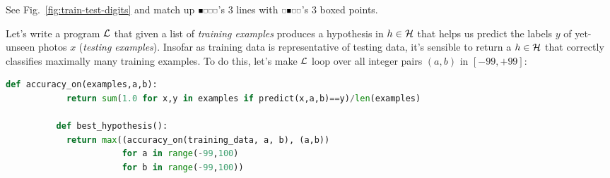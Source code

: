         \noindent
         {See Fig.\ \ref{fig:train-test-digits} and match up $\offourline{0}$'s $3$ lines with
        $\offourline{1}$'s $3$ boxed points.}


        Let's write a program $\mathcal{L}$ that given a list of \emph{training
        examples} produces a hypothesis in $h \in \mathcal{H}$ that helps us predict
        the labels $y$ of yet-unseen photos $x$ (\emph{testing examples}).
        Insofar as training data is representative of testing data, it's
        sensible to return a $h\in \mathcal{H}$ that correctly classifies maximally
        many training examples.
        To do this, let's make $\mathcal{L}$ loop over all integer pairs $(a,b)$ in
        $[-99,+99]$:  %
        \begin{lstlisting}[language=Python, basicstyle=\footnotesize\ttfamily]
          def accuracy_on(examples,a,b):
            return sum(1.0 for x,y in examples if predict(x,a,b)==y)/len(examples)

          def best_hypothesis():
            return max((accuracy_on(training_data, a, b), (a,b))
                       for a in range(-99,100)
                       for b in range(-99,100))
        \end{lstlisting}

